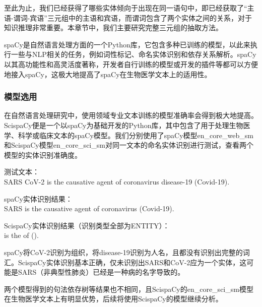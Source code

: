 \documentclass[twocolumn]{article}
\begin{document}
至此为止，我们已经获得了哪些实体倾向于出现在同一语句中，即已经获取了“主语-谓词-宾语”三元组中的主语和宾语，而谓词包含了两个实体之间的关系，对于知识推理非常重要。本章节中，我们主要研究完整三元组的抽取方法。\par
spaCy是自然语言处理方面的一个Python库，它包含多种已训练的模型，以此来执行一些与NLP相关的任务，例如词性标记、命名实体识别和依存关系解析。spaCy以其高功能性和高灵活度著称，开发者自行训练的模型或开发的插件等都可以方便地接入spaCy，这极大地提高了spaCy在生物医学文本上的适用性。\par

\subsubsection{模型选用}
在自然语言处理研究中，使用领域专业文本训练的模型准确率会得到极大地提高。ScispaCy便是一个以spaCy为基础开发的Python库，其中包含了用于处理生物医学、科学或临床文本的spaCy模型。我们分别使用了spaCy模型en\_core\_web\_sm和ScispaCy模型en\_core\_sci\_sm对同一文本的命名实体识别进行测试，查看两个模型的实体识别准确度。\par
测试文本：\\
SARS CoV-2 is the causative agent of coronavirus disease-19 (Covid-19).\par
spaCy实体识别结果：\\
SARS  is the causative agent of coronavirus  (Covid-19).\par
ScispaCy实体识别结果（识别类型全部为ENTITY）：\\
  is the  of   ().\par
spaCy将CoV-2识别为组织，将disease-19识别为人名，且都没有识别出完整的词汇。ScispaCy实体识别基本正确，仅未识别出SARS和CoV-2应为一个实体，这可能是SARS（非典型性肺炎）已经是一种病的名字导致的。\par
两个模型得到的句法依存树等结果也不相同，且ScispaCy的en\_core\_sci\_sm模型在生物医学文本上有明显优势，后续将使用ScispaCy的模型继续分析。\par
\end{document}
